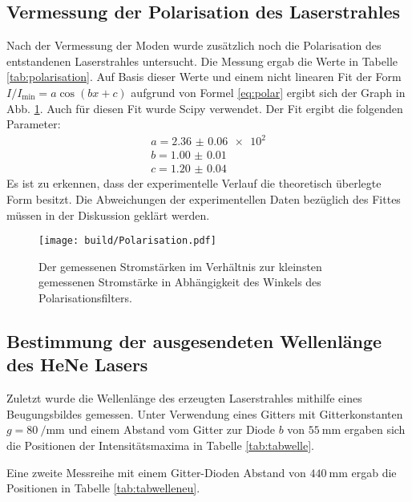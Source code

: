 \subsection{Vermessung der Polarisation des Laserstrahles}
Nach der Vermessung der Moden wurde zusätzlich noch die Polarisation des entstandenen Laserstrahles untersucht. Die Messung ergab die Werte in Tabelle \ref{tab:polarisation}. Auf Basis dieser Werte und einem nicht linearen Fit der Form $I/I_\text{min} = a  \cos(b x + c)$
 aufgrund von Formel \eqref{eq:polar} ergibt sich der Graph in Abb. \ref{fig:polarisation}. Auch für diesen Fit wurde Scipy \cite{scipy} verwendet. Der Fit ergibt die folgenden Parameter:
 \begin{gather*}
	a = \num{2.36(6)e2}\\
	b = \num{1.00(1)}\\
	c = \num{1.20(4)}
	\end{gather*}
Es ist zu erkennen, dass der experimentelle Verlauf die theoretisch überlegte Form besitzt. Die Abweichungen der experimentellen Daten bezüglich des Fittes müssen in der Diskussion geklärt werden.
\begin{figure}
	\centering
	\texttt{[image: build/Polarisation.pdf]}
	\caption{Der gemessenen Stromstärken im Verhältnis zur kleinsten gemessenen Stromstärke in Abhängigkeit des Winkels des Polarisationsfilters.}
	\label{fig:polarisation}
\end{figure}




\subsection{Bestimmung der ausgesendeten Wellenlänge des HeNe Lasers}
Zuletzt wurde die Wellenlänge des erzeugten Laserstrahles mithilfe eines Beugungsbildes gemessen. Unter Verwendung eines Gitters mit Gitterkonstanten $g = \SI{80}{\per\milli\meter}$ und einem Abstand vom Gitter zur Diode $b$ von $\SI{55}{\milli\meter}$ ergaben sich die Positionen der Intensitätsmaxima in Tabelle \ref{tab:tabwelle}.


Eine zweite Messreihe mit einem Gitter-Dioden Abstand von $\SI{440}{\milli\meter}$ ergab die Positionen in Tabelle \ref{tab:tabwelleneu}.



